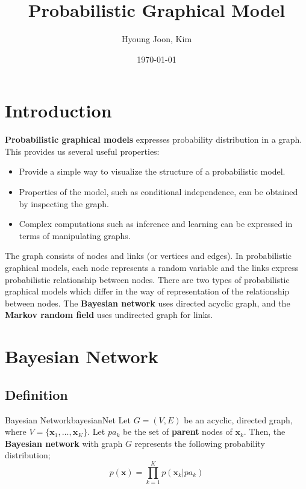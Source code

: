 \documentclass{article}
\title{Probabilistic Graphical Model}
\author{Hyoung Joon, Kim}
\date{\today}
\begin{document}
\maketitle
\tableofcontents
\newpage

\section{Introduction}
    \textbf{Probabilistic graphical models} expresses probability distribution in a graph.
    This provides us several useful properties:
    \begin{itemize}
        \item Provide a simple way to visualize the structure of a probabilistic model.
        \item Properties of the model, such as conditional independence, can be obtained by inspecting the graph.
        \item Complex computations such as inference and learning can be expressed in terms of manipulating graphs.
    \end{itemize}
    
    The graph consists of nodes and links (or vertices and edges). In probabilistic graphical models,
    each node represents a random variable and the links express probabilistic relationship between nodes.
    There are two types of probabilistic graphical models which differ in the way of representation
    of the relationship between nodes. The \textbf{Bayesian network} uses directed acyclic graph,
    and the \textbf{Markov random field} uses undirected graph for links.

\section{Bayesian Network}
    \subsection{Definition}
        \begin{defn}{Bayesian Network}{bayesianNet}
            Let $G=(V,E)$ be an acyclic, directed graph, where $V=\{\mathbf{x}_1, \dots, \textbf{x}_K\}$.
            Let $pa_k$ be the set of \textbf{parent} nodes of $\mathbf{x}_k$. Then, the \textbf{Bayesian network}
            with graph $G$ represents the following probability distribution;
            \[
            p(\mathbf{x})=\prod_{k=1}^{K}p(\mathbf{x}_k|pa_k)
            \]
        \end{defn}
\end{document}
